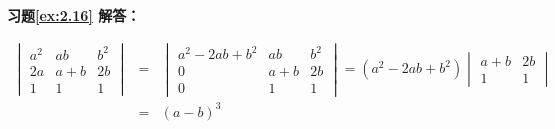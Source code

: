 \vspace{1.5em}

\textbf{习题\ref{ex:2.16} 解答：}

\enum
\item[(1)]
\begin{eqnarray*}
\begin{vmatrix} a^2 & ab & b^2 \\ 2a & a + b & 2b \\ 1 & 1 & 1 \end{vmatrix} & = & \begin{vmatrix} a^2 - 2ab + b^2 & ab & b^2 \\ 0 & a + b & 2b \\ 0 & 1 & 1 \end{vmatrix} = (a^2 - 2ab + b^2) \begin{vmatrix} a + b & 2b \\ 1 & 1 \end{vmatrix} \\
& = & (a - b)^3
\end{eqnarray*}

